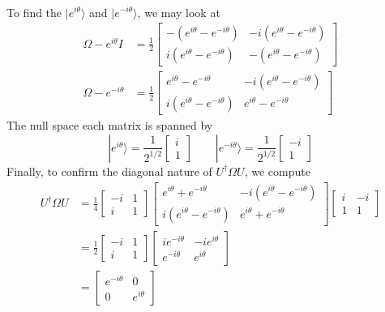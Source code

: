 \documentclass[../principles-of-quantum-mechanics.tex]{subfiles}
\begin{document}
\begin{questions}
\begin{solution}
\begin{align*}
	\end{align*}
	To find the $|e^{i\theta}\rangle$ and $|e^{-i\theta}\rangle$, we may look at
	\begin{align*}
		\Omega - e^{i\theta}I &= \frac{1}{2}\begin{bmatrix}-(e^{i\theta} - e^{-i\theta}) & -i(e^{i\theta} - e^{-i\theta}) \\ i(e^{i\theta} - e^{-i\theta}) & -(e^{i\theta} - e^{-i\theta})\end{bmatrix} \\
		\Omega - e^{-i\theta} &= \frac{1}{2}\begin{bmatrix}e^{i\theta} - e^{-i\theta} & -i(e^{i\theta} - e^{-i\theta}) \\ i(e^{i\theta} - e^{-i\theta}) & e^{i\theta} - e^{-i\theta}\end{bmatrix}
	\end{align*}
	The null space each matrix is spanned by
	\[
		|e^{i\theta}\rangle = \frac{1}{2^{1/2}}\begin{bmatrix}i \\ 1\end{bmatrix} \qquad |e^{-i\theta}\rangle = \frac{1}{2^{1/2}}\begin{bmatrix}-i \\ 1\end{bmatrix}
	\]
	Finally, to confirm the diagonal nature of $U^\dagger\Omega{U}$, we compute
	\begin{align*}
		U^\dagger\Omega{U} &= \frac{1}{4}\begin{bmatrix}-i & 1 \\ i & 1\end{bmatrix}\begin{bmatrix}e^{i\theta} + e^{-i\theta} & -i(e^{i\theta} - e^{-i\theta}) \\ i(e^{i\theta} - e^{-i\theta}) & e^{i\theta} + e^{-i\theta}\end{bmatrix}\begin{bmatrix}i & -i \\ 1 & 1\end{bmatrix} \\
		&= \frac{1}{2}\begin{bmatrix}-i & 1 \\ i & 1\end{bmatrix}\begin{bmatrix}ie^{-i\theta} & -ie^{i\theta} \\ e^{-i\theta} & e^{i\theta}\end{bmatrix} \\
		&= \begin{bmatrix}e^{-i\theta} & 0 \\ 0 & e^{i\theta}\end{bmatrix}
	\end{align*}
\end{solution}


\end{questions}
\end{document}
